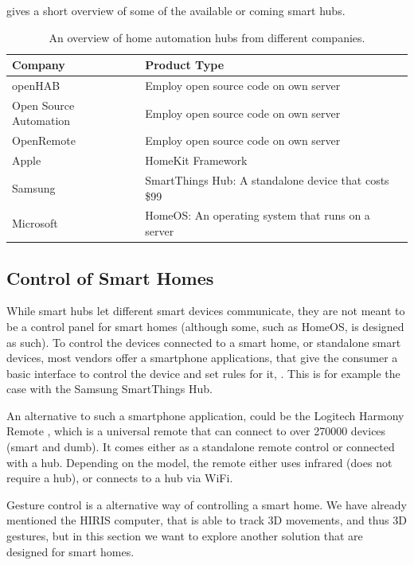  gives a short overview of some of the available or coming smart hubs. 
\begin{table}
    \centering
    \begin{tabular}{l l}
        Company                           & Product Type \\ \hline
        openHAB \cite{OPENHAB}            & Employ open source code on own server \\
        Open Source Automation \cite{OSA} & Employ open source code on own server \\
        OpenRemote \cite{OPENREMOTE}      & Employ open source code on own server \\
        Apple \cite{HOMEKIT}              & HomeKit Framework \\
        Samsung \cite{SMARTTHINGS}        & SmartThings Hub: A standalone device that costs \$99 \\
        Microsoft \cite{HOMEOS}           & HomeOS: An operating system that runs on a server
    \end{tabular}
    \caption{An overview of home automation hubs from different companies.}
    \label{table:smarthubs}
\end{table}

\subsection{Control of Smart Homes}\label{sec:smarthomecontrol}
While smart hubs let different smart devices communicate, 
they are not meant to be a control panel for smart homes (although some, such as HomeOS, is designed as such).
To control the devices connected to a smart home, or standalone smart devices, 
most vendors offer a smartphone applications, 
that give the consumer a basic interface to control the device and set rules for it, \etc.
This is for example the case with the Samsung SmartThings Hub. 

An alternative to such a smartphone application, 
could be the Logitech Harmony Remote \cite{HARMONYREMOTE}, 
which is a universal remote that can connect to over \num{270000} devices (smart and dumb). 
It comes either as a standalone remote control or connected with a hub. 
Depending on the model, the remote either uses infrared (does not require a hub), 
or connects to a hub via WiFi. 

Gesture control is a alternative way of controlling a smart home. 
We have already mentioned the HIRIS computer, 
that is able to track 3D movements, and thus 3D gestures, 
but in this section we want to explore another solution that are designed for smart homes. 


